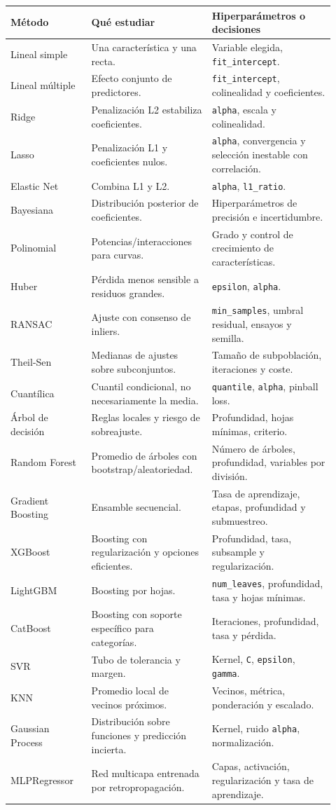 \documentclass[11pt,a4paper]{article}
\begin{document}
\small
\begin{longtable}{p{0.23\linewidth}p{0.34\linewidth}p{0.35\linewidth}}
\toprule
\textbf{Método} & \textbf{Qué estudiar} & \textbf{Hiperparámetros o decisiones}\\
\midrule
\endhead
Lineal simple & Una característica y una recta. & Variable elegida, \texttt{fit\_intercept}.\\
Lineal múltiple & Efecto conjunto de predictores. & \texttt{fit\_intercept}, colinealidad y coeficientes.\\
Ridge & Penalización L2 estabiliza coeficientes. & \texttt{alpha}, escala y colinealidad.\\
Lasso & Penalización L1 y coeficientes nulos. & \texttt{alpha}, convergencia y selección inestable con correlación.\\
Elastic Net & Combina L1 y L2. & \texttt{alpha}, \texttt{l1\_ratio}.\\
Bayesiana & Distribución posterior de coeficientes. & Hiperparámetros de precisión e incertidumbre.\\
Polinomial & Potencias/interacciones para curvas. & Grado y control de crecimiento de características.\\
Huber & Pérdida menos sensible a residuos grandes. & \texttt{epsilon}, \texttt{alpha}.\\
RANSAC & Ajuste con consenso de inliers. & \texttt{min\_samples}, umbral residual, ensayos y semilla.\\
Theil-Sen & Medianas de ajustes sobre subconjuntos. & Tamaño de subpoblación, iteraciones y coste.\\
Cuantílica & Cuantil condicional, no necesariamente la media. & \texttt{quantile}, \texttt{alpha}, pinball loss.\\
Árbol de decisión & Reglas locales y riesgo de sobreajuste. & Profundidad, hojas mínimas, criterio.\\
Random Forest & Promedio de árboles con bootstrap/aleatoriedad. & Número de árboles, profundidad, variables por división.\\
Gradient Boosting & Ensamble secuencial. & Tasa de aprendizaje, etapas, profundidad y submuestreo.\\
XGBoost & Boosting con regularización y opciones eficientes. & Profundidad, tasa, subsample y regularización.\\
LightGBM & Boosting por hojas. & \texttt{num\_leaves}, profundidad, tasa y hojas mínimas.\\
CatBoost & Boosting con soporte específico para categorías. & Iteraciones, profundidad, tasa y pérdida.\\
SVR & Tubo de tolerancia y margen. & Kernel, \texttt{C}, \texttt{epsilon}, \texttt{gamma}.\\
KNN & Promedio local de vecinos próximos. & Vecinos, métrica, ponderación y escalado.\\
Gaussian Process & Distribución sobre funciones y predicción incierta. & Kernel, ruido \texttt{alpha}, normalización.\\
MLPRegressor & Red multicapa entrenada por retropropagación. & Capas, activación, regularización y tasa de aprendizaje.\\
\bottomrule
\end{longtable}
\normalsize
\end{document}
